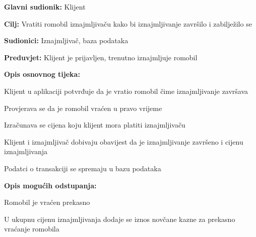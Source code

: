 						\noindent {}
						\begin{packed_item}
							
							\item \textbf{Glavni sudionik: }Klijent
							\item  \textbf{Cilj: }Vratiti romobil iznajmljivaču kako bi iznajmljivanje završilo i zabilježilo se
							\item  \textbf{Sudionici: }Iznajmljivač, baza podataka
							\item  \textbf{Preduvjet: }Klijent je prijavljen, trenutno iznajmljuje romobil
							\item  \textbf{Opis osnovnog tijeka:}
							
							\item[] \begin{packed_enum}
								
								\item Klijent u aplikaciji potvrđuje da je vratio romobil čime iznajmljivanje završava 
								\item Provjerava se da je romobil vraćen u pravo vrijeme 
								\item Izračunava se cijena koju klijent mora platiti iznajmljivaču 
								\item Klijent i iznajmljivač dobivaju obavijest da je iznajmljivanje završeno i cijenu iznajmljivanja  
								\item Podatci o transakciji se spremaju u bazu podataka
							\end{packed_enum}
							
							\item  \textbf{Opis mogućih odstupanja:}
							
							\item[] \begin{packed_item}
								
								\item[2.a] Romobil je vraćen prekasno 
								\item[] \begin{packed_enum}
									
									\item U ukupnu cijenu iznajmljivanja dodaje se iznos novčane kazne za prekasno vraćanje romobila 
									
									
								\end{packed_enum}
								
							\end{packed_item}
						\end{packed_item}
